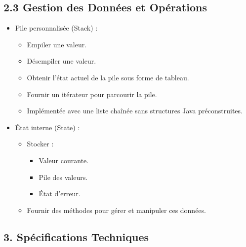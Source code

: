 \documentclass[12pt]{report}
\begin{document}
            \subsection*{2.3 Gestion des Données et Opérations}
                \begin{itemize}
                    \item Pile personnalisée (Stack) :
                    \begin{itemize}
                        \item Empiler une valeur.
                        \item Désempiler une valeur.
                        \item Obtenir l’état actuel de la pile sous forme de tableau.
                        \item Fournir un itérateur pour parcourir la pile.
                        \item Implémentée avec une liste chaînée sans structures Java préconstruites.
                    \end{itemize}

                    \item État interne (State) :
                    \begin{itemize}
                        \item Stocker :
                        \begin{itemize}
                            \item Valeur courante.
                            \item Pile des valeurs.
                            \item État d’erreur.
                        \end{itemize}

                        \item Fournir des méthodes pour gérer et manipuler ces données.
                    \end{itemize}
                \end{itemize}

            \subsection*{3. Spécifications Techniques}
\end{document}
